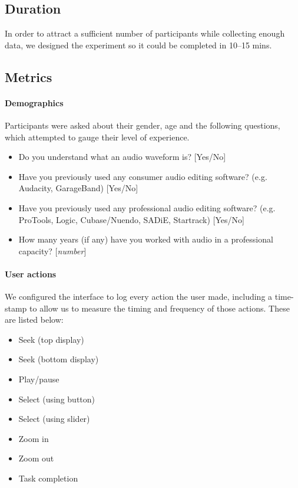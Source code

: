 \subsection{Duration}
In order to attract a sufficient number of participants while collecting enough data, we designed the experiment so it
could be completed in 10--15 mins.

\subsection{Metrics}\label{sec:metrics}
\paragraph{Demographics}
Participants were asked about their gender, age and the following questions, which attempted to gauge their level of
experience.

{\singlespacing
\begin{itemize}
  \item Do you understand what an audio waveform is? [Yes/No]
  \item Have you previously used any consumer audio editing software? (e.g.
    Audacity, GarageBand) [Yes/No]
  \item Have you previously used any professional audio editing software? (e.g.
    ProTools, Logic, Cubase/Nuendo, SADiE, Startrack) [Yes/No]
  \item How many years (if any) have you worked with audio in a professional
    capacity? [\textit{number}]
\end{itemize}
}

\paragraph{User actions}
We configured the interface to log every action the user made, including a time-stamp to allow us to measure the timing
and frequency of those actions. These are listed below:

{\singlespacing
\begin{itemize}
  \item Seek (top display)
  \item Seek (bottom display)
  \item Play/pause
  \item Select (using button)
  \item Select (using slider)
  \item Zoom in
  \item Zoom out
  \item Task completion
\end{itemize}
}

